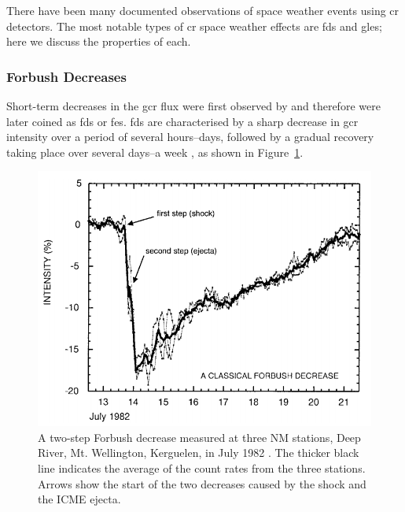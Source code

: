 There have been many documented observations of space weather events using \gls{cr} detectors. The most notable types of \gls{cr} space weather effects are \glspl{fd} and \glspl{gle}; here we discuss the properties of each.

\subsubsection*{Forbush Decreases}\label{sec:intro_FDs}

Short-term decreases in the \gls{gcr} flux were first observed by  \citet{forbush_effects_1937} and therefore were later coined as \glspl{fd} or \glspl{fe}. \glspl{fd} are characterised by a sharp decrease in \gls{gcr} intensity over a period of several hours--days, followed by a gradual recovery taking place over several days--a week \citep{cane_coronal_2000, belov_forbush_2008, wawrzynczak_modeling_2010}, as shown in Figure~\ref{fig:FD_plot}.

\begin{figure}[htb!]
	\centering
	\includegraphics[width=0.75\columnwidth]{FD_plot.png}
	\caption{A two-step Forbush decrease measured at three NM stations, Deep River, Mt. Wellington, Kerguelen, in July 1982 \citep{cane_coronal_2000}. The thicker black line indicates the average of the count rates from the three stations. Arrows show the start of the two decreases caused by the shock and the ICME ejecta.}
	\label{fig:FD_plot}
\end{figure}

